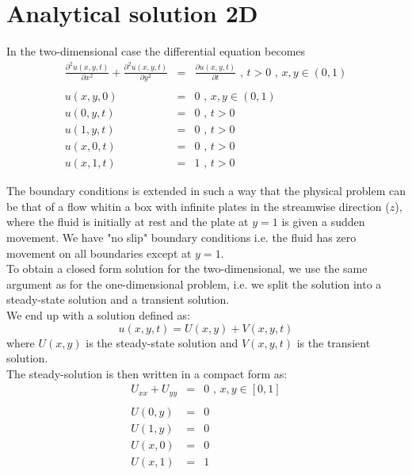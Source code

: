 \documentclass{article}
\begin{document}
\section{Analytical solution 2D}
In the two-dimensional case the differential equation becomes
\begin{subequations}
	\begin{eqnarray}
	\frac{\partial^2 u(x,y,t)}{\partial x^2} + \frac{\partial^2 u(x,y,t)}{\partial y^2} &=&  \frac{\partial u(x,y,t)}{\partial t} \textit{ , } t>0 \textit{ , } x,y \in (0,1) \\ \nonumber \\
	u(x,y,0) &=& 0 \textit{ , } x,y \in (0,1) \\ 
	u(0,y,t) &=& 0 \textit{ , } t> 0 \\
	u(1,y,t) &=& 0 \textit{ , } t> 0 \\
	u(x,0,t) &=& 0 \textit{ , } t> 0  \\
	u(x,1,t) &=& 1 \textit{ , } t> 0 
	\end{eqnarray}
\end{subequations}

The boundary conditions is extended in such a way that the physical problem can be that of a flow whitin a box with infinite plates in the streamwise direction ($z$), where the fluid is initially at rest and the plate at $y=1$ is given a sudden movement. We have "no slip" boundary conditions i.e. the fluid has zero movement on all boundaries except at $y=1$.\\

To obtain a closed form solution for the two-dimensional, we use the same argument as for the one-dimensional problem, i.e. we split the solution into a steady-state solution and a transient solution.\\

We end up with a solution defined as:
\begin{equation}
u(x,y,t) = U(x,y) + V(x,y,t)
\end{equation}
where $U(x,y)$ is the steady-state solution and $V(x,y,t)$ is the transient solution.\\

The steady-solution is then written in a compact form as:
\begin{subequations}
	\begin{eqnarray}
	U_{xx} + U_{yy} &=& 0 \textit{ , } x,y \in [0,1]\\ \nonumber
	\\
	U(0,y) &=& 0 \textit{  } \\
	U(1,y) &=& 0 \textit{  } \\
	U(x,0) &=& 0 \textit{  } \\
	U(x,1) &=& 1 \textit{  } 
	\end{eqnarray}
\end{subequations}
\end{document}
